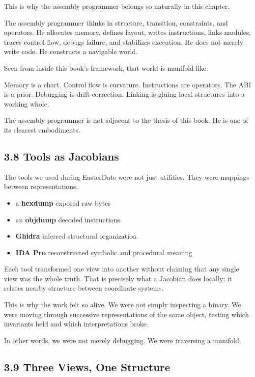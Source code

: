 This is why the assembly programmer belongs so naturally in this
chapter.

The assembly programmer thinks in structure, transition, constraints,
and operators. He allocates memory, defines layout, writes instructions,
links modules, traces control flow, debugs failure, and stabilizes
execution. He does not merely write code. He constructs a navigable
world.

Seen from inside this book's framework, that world is manifold-like.

Memory is a chart. Control flow is curvature. Instructions are
operators. The ABI is a prior. Debugging is drift correction. Linking is
gluing local structures into a working whole.

The assembly programmer is not adjacent to the thesis of this book. He
is one of its clearest embodiments.

\hypertarget{tools-as-jacobians}{%
\subsection{3.8 Tools as Jacobians}\label{tools-as-jacobians}}

The tools we used during EasterDate were not just utilities. They were
mappings between representations.

\begin{itemize}
\tightlist
\item
  a \textbf{hexdump} exposed raw bytes
\item
  an \textbf{objdump} decoded instructions
\item
  \textbf{Ghidra} inferred structural organization
\item
  \textbf{IDA Pro} reconstructed symbolic and procedural meaning
\end{itemize}

Each tool transformed one view into another without claiming that any
single view was the whole truth. That is precisely what a Jacobian does
locally: it relates nearby structure between coordinate systems.

This is why the work felt so alive. We were not simply inspecting a
binary. We were moving through successive representations of the same
object, testing which invariants held and which interpretations broke.

In other words, we were not merely debugging. We were traversing a
manifold.

\hypertarget{three-views-one-structure}{%
\subsection{3.9 Three Views, One
Structure}\label{three-views-one-structure}}

